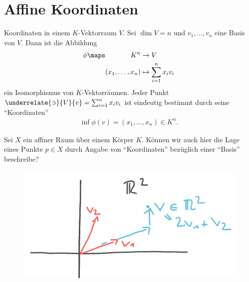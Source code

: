 \section{Affine Koordinaten}
Koordinaten in einem \( K \)-Vektorraum \( V \). Sei \( \dim V=n \) und \( v_1,\dotsc , v_n \) eine Basis von \( V \). Dann ist die Abbildung
\begin{align*}
    \phi\maps  \begin{aligned}[t]
        K^n&\to V\\
        (x_1,\dotsc,x_n)&\mapsto \sum\limits_{i=1}^{n}x_i v_i
    \end{aligned}
\end{align*}
ein Isomorphismus von \( K \)-Vektorräumen. Jeder Punkt \( \underrelate{\ni}{V}{v}=\sum_{i=1}^{n}x_i v_i \) ist eindeutig bestimmt durch seine \enquote{Koordinaten}
\begin{align*}
    \inf{\phi}(v)=(x_1,\dotsc,x_n)\in K^n.
\end{align*}
\begin{frage*}
    Sei \( X \) ein affiner Raum über einem Körper \( K \). Können wir auch hier die Lage eines Punkte \( p\in X \) durch Angabe von \enquote{Koordinaten} bezüglich einer \enquote{Basis} beschreibe?
    \begin{figure}[H]
        \centering
        \includegraphics[width=0.5\linewidth]{figures/affine_koordinaten_r_2_hoffnung}
        \label{fig:affine_koordinaten_r_2_hoffnung}
    \end{figure}
    
\end{frage*}
